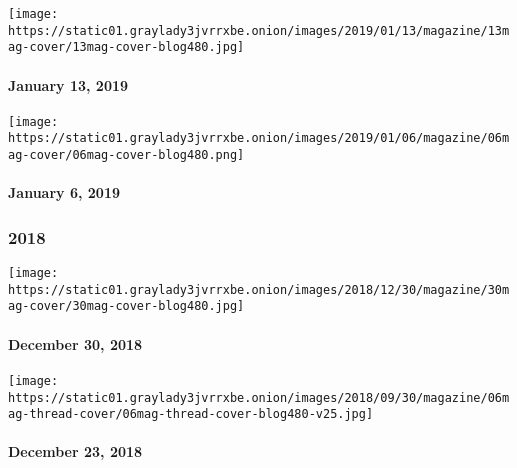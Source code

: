\href{https://www.nytimes3xbfgragh.onion/issue/magazine/2019/01/11/the-11318-issue}{}

\texttt{[image: https://static01.graylady3jvrrxbe.onion/images/2019/01/13/magazine/13mag-cover/13mag-cover-blog480.jpg]}

\hypertarget{january-13-2019}{%
\paragraph{January 13, 2019}\label{january-13-2019}}

\href{https://www.nytimes3xbfgragh.onion/issue/magazine/2019/01/04/the-1619-issue}{}

\texttt{[image: https://static01.graylady3jvrrxbe.onion/images/2019/01/06/magazine/06mag-cover/06mag-cover-blog480.png]}

\hypertarget{january-6-2019}{%
\paragraph{January 6, 2019}\label{january-6-2019}}

\hypertarget{2018}{%
\subsubsection{2018}\label{2018}}

\href{https://www.nytimes3xbfgragh.onion/interactive/2018/12/27/magazine/lives-they-lived-obituaries.html}{}

\texttt{[image: https://static01.graylady3jvrrxbe.onion/images/2018/12/30/magazine/30mag-cover/30mag-cover-blog480.jpg]}

\hypertarget{december-30-2018}{%
\paragraph{December 30, 2018}\label{december-30-2018}}

\href{https://www.nytimes3xbfgragh.onion/issue/magazine/2019/01/03/122318-issue}{}

\texttt{[image: https://static01.graylady3jvrrxbe.onion/images/2018/09/30/magazine/06mag-thread-cover/06mag-thread-cover-blog480-v25.jpg]}

\hypertarget{december-23-2018}{%
\paragraph{December 23, 2018}\label{december-23-2018}}

\href{https://www.nytimes3xbfgragh.onion/issue/magazine/2019/01/03/121618-issue}{}

